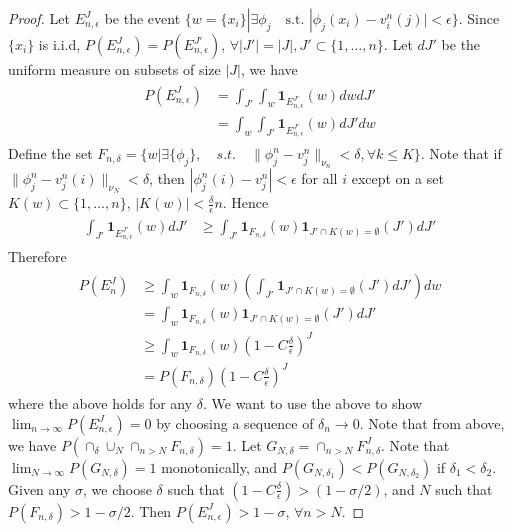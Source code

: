\documentclass[final]{siamart0516}
\newcommand{\one}{\mathbf{1}}
\begin{document}
 
\begin{proof}

Let $E^J_{n, \epsilon}$ be the event $\{w = \{x_i\} | \exists \phi_j \quad \text{s.t. } |\phi_j(x_i) - v^n_i(j)| < \epsilon \}$. Since $\{x_i\}$ is i.i.d, $P(E^J_{n, \epsilon}) = P(E^{J'}_{n, \epsilon})$, $\forall |J'| = |J|, J' \subset \{1, \dots, n\}$. Let $dJ'$ be the uniform measure on subsets of size $|J|$, we have 
\begin{align}
\begin{aligned}
P(E^J_{n, \epsilon}) &= \int_{J'} \int_w \one_{E^{J'}_{n, \epsilon}}(w) dw dJ'\\
&= \int_{w} \int_{J'} \one_{E^{J'}_{n, \epsilon}}(w) dJ'dw 
\end{aligned}
\end{align}
Define the set $F_{n, \delta} = \{w| \exists \{\phi_j\}, \quad s.t.\quad \|\phi_j^n - v_j^n\|_{\nu_n} < \delta ,\forall k \leq K \}$. Note that if $\|\phi^n_j - v^n_j(i)\|_{\nu_N} < \delta$, then $|\phi^n_j(i) - v^n_j| < \epsilon$ for all $i$ except on a set $K(w)\subset \{1, \dots, n\}$, $|K(w)| <\frac{\delta}{\epsilon} n$. 
Hence 
\begin{align}
\begin{aligned}
 \int_{J'} \one_{E^{J'}_{n, \epsilon}}(w) dJ' &\geq  \int_{J'} \one_{F_{n, \delta}}(w) \one_{J' \cap K(w) = \emptyset}(J')dJ'
\end{aligned}
\end{align}
Therefore
\begin{align}
\begin{aligned}
P(E^J_n) &\geq \int_{w} \one_{F_{n, \delta}}(w) (\int_{J'} \one_{J' \cap K(w) = \emptyset}(J') dJ') dw\\
&= \int_{w}\one_{F_{n, \delta}}(w) \one_{J' \cap K(w) = \emptyset}(J') dJ'\\
&\geq \int_{w} \one_{F_{n, \delta}}(w) (1 - C\frac{\delta}{\epsilon})^J\\
&= P(F_{n, \delta})  (1 - C\frac{\delta}{\epsilon})^J
\end{aligned}
\end{align}
where the above holds for any $\delta$. We want to use the above to show $\lim_{n \rightarrow \infty}P(E^J_{n, \epsilon}) = 0$ by choosing a sequence of $\delta_n \rightarrow 0$. Note that from above, we have $P(\cap_\delta \cup_N \cap_{n>N} F_{n, \delta}) = 1$. Let $G_{N, \delta} = \cap_{n>N} F^{J}_{n, \delta}$. Note that $\lim_{N\rightarrow \infty} P(G_{N, \delta}) = 1$ monotonically, and $P(G_{N, \delta_1}) < P(G_{N, \delta_2})$ if $\delta_1 < \delta_2$.  Given any $\sigma$, we choose $\delta$ such that $(1 - C\frac{\delta}{\epsilon}) > (1 - \sigma/2)$, and $N$ such that $P(F_{n, \delta}) > 1 - \sigma/2$. Then $P(E^J_{n, \epsilon}) > 1 - \sigma$, $\forall n > N$. 
\end{proof} 
 
\end{document}

